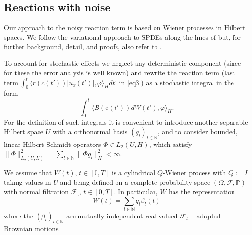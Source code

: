 \documentclass[a4paper,10pt]{article}
\newcommand{\N}{\mathbb{N}}
\def\mbN{\mathbb{N}}
\numberwithin{equation}{section}
\begin{document}
\subsection{Reactions with noise}
\label{sec:stochset}

Our approach to the noisy reaction term is based on Wiener processes in Hilbert spaces. We follow the variational approach to SPDEs along the lines of \cite{RoecknerBuch} but, for further background, detail, and proofs, also refer to \cite{Powell,DaPratoBuch}.

To account for stochastic effects we neglect any deterministic component (since for these the error analysis is well known) and rewrite the reaction term (last term $\int_{0}^{t} \langle r(c(t')) |u_{x}(t')|, \varphi \rangle_{H} dt'$ in \eqref{eq3}) as a stochastic integral in the form
\begin{equation} \label{def_stochreact}
 \int_0^t \langle B(c(t')) dW(t'), \varphi \rangle_{H}.
\end{equation}
For the definition of such integrals it is convenient to introduce another separable Hilbert space $U$ with a orthonormal basis $(g_l)_{l \in \mbN}$, and to consider bounded, linear Hilbert-Schmidt operators $\Phi \in L_{2}(U,H)$, which satisfy $\| \Phi \|_{L_{2}(U,H)}^2 = \sum_{l \in \mbN} \| \Phi g_l \|_H^2 < \infty$.

We assume that $W(t)$, $t \in [0,T]$ is a cylindrical $Q$-Wiener process with $Q:=I$ taking values in $U$ and being defined on a complete probability space $(\Omega,\mathcal{F}, \mathbb{P})$ with normal filtration $\mathcal{F}_{t}$, $t \in [0,T]$. In particular, $W$ has the representation
\begin{equation} \label{repW}
 W(t) = \sum_{l \in \N} g_{l} \beta_{l}(t)
\end{equation}
where the $(\beta_{l})_{l \in \N}$ are mutually independent real-valued $\mathcal{F}_{t}-$adapted Brownian motions.
\end{document}
